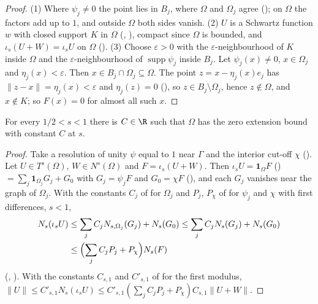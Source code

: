 \begin{proof}
\leanok
{}
(1) Where $\psi_j \neq 0$ the point lies in $B_j$, where $\Omega$ and $\Omega_j$ agree
(); on $\Omega$ the factors add up to $1$, and outside $\Omega$ both
sides vanish. (2) $U$ is a Schwartz function $w$ with closed support $K$ in $\Omega$
(, ), compact since $\Omega$ is
bounded, and $\iota_s(U + W) = \iota_s U$ on $\Omega$ ().
(3) Choose $\varepsilon > 0$ with the $\varepsilon$-neighbourhood of $K$ inside $\Omega$ and the
$\varepsilon$-neighbourhood of $\operatorname{supp} \psi_j$ inside $B_j$. Let $\psi_j(x) \neq 0$,
$x \in \Omega_j$ and $\eta_j(x) < \varepsilon$. Then $x \in B_j \cap \Omega_j \subseteq \Omega$.
The point $z = x - \eta_j(x) e_j$ has $\|z - x\| = \eta_j(x) < \varepsilon$ and $\eta_j(z) = 0$
(), so $z \in B_j \setminus \Omega_j$, hence $z \notin \Omega$, and
$x \notin K$; so $F(x) = 0$ for almost all such $x$.
\end{proof}

\begin{theorem}
\label{thm:zero-extension-hardy}
\leanok
{}
For every $1/2 < s < 1$ there is $C \in \R$ such that $\Omega$ has the zero extension bound with
constant $C$ at $s$.
\end{theorem}

\begin{proof}
\leanok
{}
Take a resolution of unity $\psi$ equal to $1$ near $\Gamma$ and the interior cut-off $\chi$
(). Let $U \in T^s(\Omega)$, $W \in N^s(\Omega)$ and
$F = \iota_s(U + W)$. Then $\iota_s U = \mathbf 1_\Omega F$
() $= \sum_j \mathbf 1_{\Omega_j} G_j + G_0$ with
$G_j = \psi_j F$ and $G_0 = \chi F$ (), and each $G_j$
vanishes near the graph of $\Omega_j$. With the constants $C_j$ of
 for $\Omega_j$ and $P_j$, $P_\chi$ of 
for $\psi_j$ and $\chi$ with first differences, $s < 1$,
\begin{align*}
  N_s(\iota_s U) &\leq \sum_j C_j N_{s,\Omega_j}(G_j) + N_s(G_0)
  \leq \sum_j C_j N_s(G_j) + N_s(G_0) \\
  &\leq \Bigl(\sum_j C_j P_j + P_\chi\Bigr) N_s(F)
\end{align*}
(, ). With the constants $C_{s,1}$ and $C'_{s,1}$
of  for the first modulus,
$\|U\| \leq C'_{s,1} N_s(\iota_s U) \leq C'_{s,1} (\sum_j C_j P_j + P_\chi) C_{s,1} \|U + W\|$.
\end{proof}

